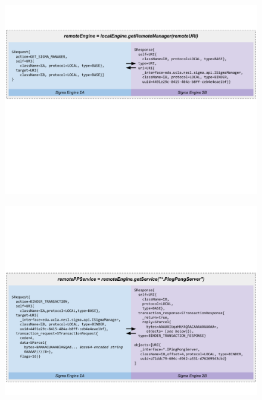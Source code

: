\documentclass[prodmode]{acmlarge}
\begin{document}
\begin{figure}[h]
\centering
\includegraphics[width=\textwidth]{drawings/WireExchange1.pdf}
\end{figure}


\begin{figure}[h]
\centering
\includegraphics[width=\textwidth]{drawings/WireExchange2.pdf}
\end{figure}



\end{document}
